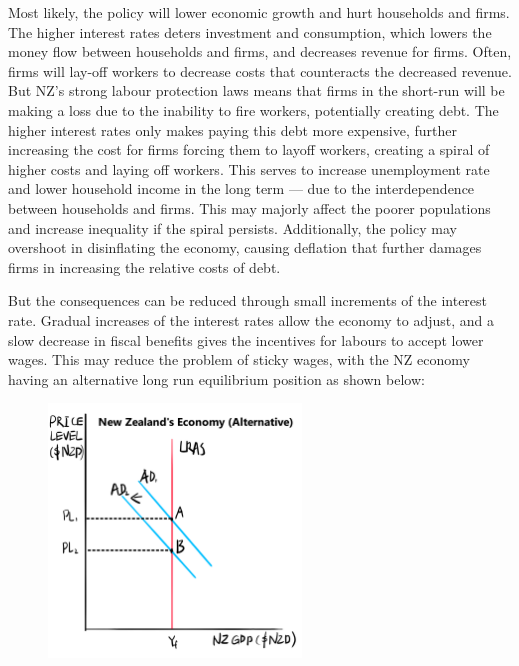 \documentclass[a4paper,12pt]{article}
\begin{document}

Most likely, the policy will lower economic growth and hurt households and firms. The higher interest rates deters investment and consumption, which lowers the money flow between households and firms, and decreases revenue for firms. Often, firms will lay-off workers to decrease costs that counteracts the decreased revenue. But NZ's strong labour protection laws means that firms in the short-run will be making a loss due to the inability to fire workers, potentially creating debt. The higher interest rates only makes paying this debt more expensive, further increasing the cost for firms forcing them to layoff workers, creating a spiral of higher costs and laying off workers. This serves to increase unemployment rate and lower household income in the long term --- due to the interdependence between households and firms. This may majorly affect the poorer populations and increase inequality if the spiral persists.
Additionally, the policy may overshoot in disinflating the economy, causing deflation that further damages firms in increasing the relative costs of debt.

But the consequences can be reduced through small increments of the interest rate. Gradual increases of the interest rates allow the economy to adjust, and a slow decrease in fiscal benefits gives the incentives for labours to accept lower wages. This may reduce the problem of sticky wages, with the NZ economy having an alternative long run equilibrium position as shown below:

\begin{figure}[H]
    \centering
    \includegraphics[width=0.6\textwidth]{assets/macro_alt.png}
\end{figure}
\end{document}
